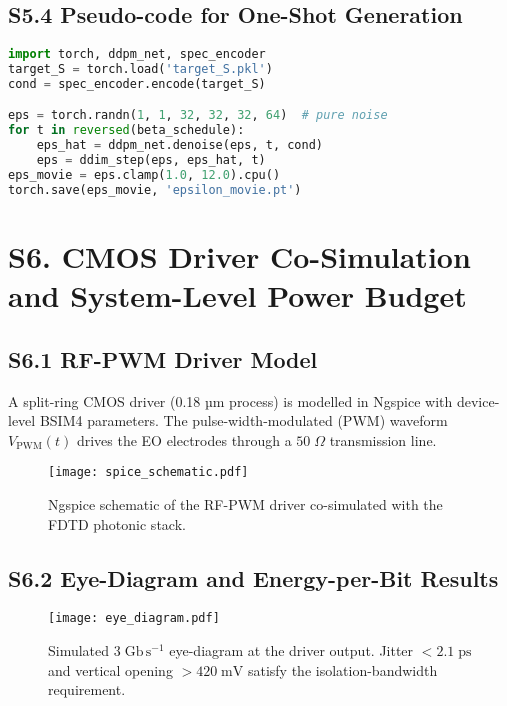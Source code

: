 \documentclass[11pt]{article}
\begin{document}
\subsection*{S5.4  Pseudo-code for One-Shot Generation}

\begin{lstlisting}[language=Python,caption={Minimal inference loop producing a 4-D permittivity movie.},label={lst:S5_infer}]
import torch, ddpm_net, spec_encoder
target_S = torch.load('target_S.pkl')
cond = spec_encoder.encode(target_S)

eps = torch.randn(1, 1, 32, 32, 32, 64)  # pure noise
for t in reversed(beta_schedule):
    eps_hat = ddpm_net.denoise(eps, t, cond)
    eps = ddim_step(eps, eps_hat, t)
eps_movie = eps.clamp(1.0, 12.0).cpu()
torch.save(eps_movie, 'epsilon_movie.pt')
\end{lstlisting}
\section*{S6. CMOS Driver Co-Simulation and System-Level Power Budget}
\label{sec:S6_cmos}

\subsection*{S6.1  RF-PWM Driver Model}

A split-ring CMOS driver (0.18 µm process) is modelled in Ngspice with
device-level BSIM4 parameters.  The pulse-width-modulated (PWM)
waveform \(V_{\mathrm{PWM}}(t)\) drives the EO electrodes through a
\(50\;\Omega\) transmission line.

\begin{figure}[h]
  \centering
  \texttt{[image: spice\_schematic.pdf]}
  \caption{Ngspice schematic of the RF-PWM driver co-simulated with the
  FDTD photonic stack.}
  \label{fig:S6_spice}
\end{figure}

\subsection*{S6.2  Eye-Diagram and Energy-per-Bit Results}

\begin{figure}[h]
  \centering
  \texttt{[image: eye\_diagram.pdf]}
  \caption{Simulated \(3\;\mathrm{Gb\,s^{-1}}\) eye-diagram at the
  driver output.  Jitter \(<\!2.1\;\mathrm{ps}\) and vertical opening
  \(>\!420\;\mathrm{mV}\) satisfy the isolation-bandwidth
  requirement.}
  \label{fig:S6_eye}
\end{figure}
\end{document}
